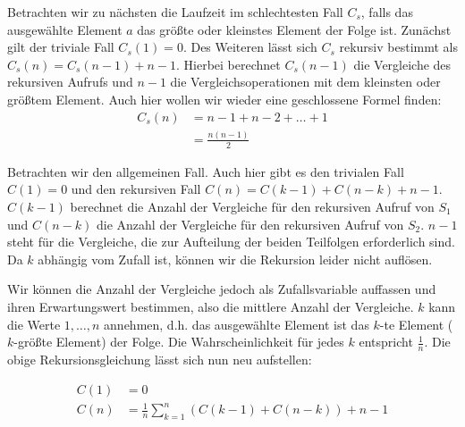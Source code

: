 \begin{Lza}[Quicksort]\label{QuicksortLza}
\hspace{\parindent}Betrachten wir zu nächsten die Laufzeit im schlechtesten Fall $C_s$, falls das ausgewählte Element $a$ das größte oder kleinstes Element der Folge ist. Zunächst gilt der triviale Fall  $C_s(1) = 0$. Des Weiteren lässt sich $C_s$ rekursiv bestimmt als $C_s(n)  = C_s(n-1) + n-1$. Hierbei berechnet $C_s(n-1)$ die Vergleiche des rekursiven Aufrufs und $n-1$ die Vergleichsoperationen mit dem kleinsten oder größtem Element. Auch hier wollen wir wieder eine geschlossene Formel finden:
\begin{align*}
  C_s(n) &= n-1 + n-2 + \ldots + 1\\
         &= \frac{n(n-1)}{2}
\end{align*}

Betrachten wir den allgemeinen Fall. Auch hier gibt es den trivialen Fall $C(1) = 0$ und den rekursiven Fall $C(n) = C(k-1) + C(n-k) + n-1$. $C(k-1)$ berechnet die Anzahl der Vergleiche für den rekursiven Aufruf von $S_1$ und $C(n-k)$ die Anzahl der Vergleiche für den rekursiven Aufruf von $S_2$. $n-1$ steht für die Vergleiche, die zur Aufteilung der beiden Teilfolgen erforderlich sind. Da $k$ abhängig vom Zufall ist, können wir die Rekursion leider nicht auflösen.

Wir können die Anzahl der Vergleiche jedoch als Zufallsvariable auffassen und ihren Erwartungswert bestimmen, also die mittlere Anzahl der Vergleiche. $k$ kann die Werte $1, \ldots, n$ annehmen, d.h. das ausgewählte Element ist das $k$-te Element ($k$-größte Element) der Folge. Die Wahrscheinlichkeit für jedes $k$ entspricht $\frac{1}{n}$. Die obige Rekursionsgleichung lässt sich nun neu aufstellen:

\begin{align*}
  C(1) &= 0\\
  C(n) &=  \frac{1}{n} \sum_{k=1}^{n} \left( C(k-1) + C(n-k)\right) + n-1
\end{align*}


\end{Lza}
